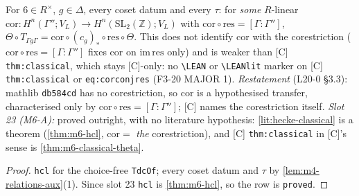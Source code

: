 \begin{theorem}\label{thm:classical-model}
  \leanok
  For $6\in R^\times$, $g\in\Delta$, every coset datum and every $\tau$: for \emph{some} $R$-linear
  $\mathrm{cor}\colon H^n(\Gamma'';V_L)\to H^n(\mathrm{SL}_2(\mathbb Z);V_L)$ with $\mathrm{cor}\circ\mathrm{res}=[\Gamma:\Gamma'']$,
  $\Theta\circ T_{\Gamma g\Gamma}=\mathrm{cor}\circ(c_g)_*\circ\mathrm{res}\circ\Theta$. This does not identify $\mathrm{cor}$
  with the corestriction ($\mathrm{cor}\circ\mathrm{res}=[\Gamma:\Gamma'']$ fixes $\mathrm{cor}$ on $\mathrm{im}\,\mathrm{res}$
  only) and is weaker than [C] \texttt{thm:classical}, which stays [C]-only: no \texttt{\textbackslash LEAN} or
  \texttt{\textbackslash LEANlit} marker on [C] \texttt{thm:classical} or \texttt{eq:corconjres} (F3-20 MAJOR 1).
  \emph{Restatement} (L20-0 \S3.3): mathlib \texttt{db584cd} has no corestriction, so $\mathrm{cor}$ is a hypothesised transfer,
  characterised only by $\mathrm{cor}\circ\mathrm{res}=[\Gamma:\Gamma'']$; [C] names the corestriction itself.
  \emph{Slot 23 (M6-A):} proved outright, with no literature hypothesis: \ref{lit:hecke-classical} is a theorem
  (\ref{thm:m6-hcl}, $\mathrm{cor}=$ \emph{the} corestriction), and [C] \texttt{thm:classical} in [C]'s sense is
  \ref{thm:m6-classical-theta}.
\end{theorem}
\begin{proof}
  \leanok
  \texttt{hcl} for the choice-free \texttt{TdcOf}; every coset datum and $\tau$ by \ref{lem:m4-relations-aux}(1). Since slot 23
  \texttt{hcl} is \ref{thm:m6-hcl}, so the row is \texttt{proved}.
\end{proof}

